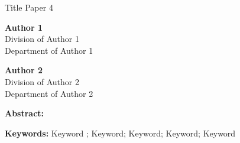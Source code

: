 
\begin{center}
	{Title Paper 4}\\
	
	\vspace{0.20cm}
	
	\textbf{Author 1}\\
	Division of Author 1\\
	Department of Author 1\\
	
	\vspace{0.12cm}
	
	\textbf{Author 2}\\
	Division of Author 2\\
	Department of Author 2\\
	
	\vspace{0.12cm}
\end{center}

\textbf{Abstract: }\lipsum[1]

\textbf{Keywords: } Keyword ; Keyword; Keyword; Keyword; Keyword